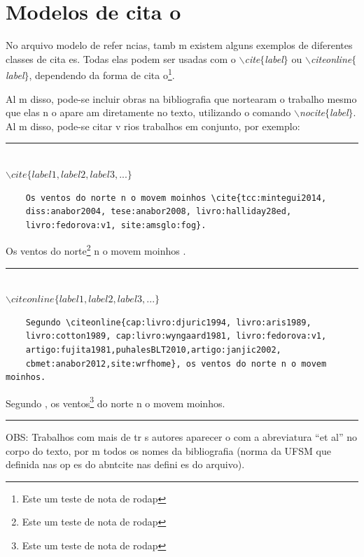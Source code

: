 \documentclass{article}
\begin{document}
   \section{Modelos de cita o}
      \par No arquivo modelo de refer ncias, tamb m existem alguns exemplos de diferentes classes de cita es. Todas elas podem ser usadas com o \textit{$\backslash$cite$\{$label$\}$} ou \textit{$\backslash$citeonline$\{$label$\}$}, dependendo da forma de cita o\footnote{Este   um teste de nota de rodap }.

	\par Al m disso, pode-se incluir obras na bibliografia que nortearam o trabalho mesmo que elas n o apare am diretamente no texto, utilizando o comando \textit{$\backslash$nocite$\{$label$\}$}. Al m disso, pode-se citar v rios trabalhos em conjunto, por exemplo:
	
	\begin{center}\rule{0.5\textwidth}{1pt}\\$\backslash cite\{label1,label2,label3,...\}$\end{center}

	\begin{verbatim}
	Os ventos do norte n o movem moinhos \cite{tcc:mintegui2014, 
	diss:anabor2004, tese:anabor2008, livro:halliday28ed, 
	livro:fedorova:v1, site:amsglo:fog}.
	\end{verbatim}
	    
	\par Os ventos do norte\footnote{Este   um teste de nota de rodap } n o movem moinhos \cite{tcc:mintegui2014,diss:anabor2004,tese:anabor2008,livro:halliday28ed,livro:fedorova:v1,site:amsglo:fog}.
        
        \begin{center}\rule{0.5\textwidth}{1pt}\\$\backslash citeonline\{label1,label2,label3,...\}$\end{center}
        
	\begin{verbatim}
	Segundo \citeonline{cap:livro:djuric1994, livro:aris1989, 
	livro:cotton1989, cap:livro:wyngaard1981, livro:fedorova:v1, 
	artigo:fujita1981,puhalesBLT2010,artigo:janjic2002,
	cbmet:anabor2012,site:wrfhome}, os ventos do norte n o movem moinhos.
	\end{verbatim}
            
        \par Segundo , os ventos\footnote{Este   um teste de nota de rodap } do norte n o movem moinhos.
        \begin{center}\rule{0.5\textwidth}{1pt}\end{center}   
         \par OBS: Trabalhos com mais de tr s autores aparecer o com a abreviatura ``et al'' no corpo do texto, por m todos os nomes da bibliografia (norma da UFSM que   definida nas op es do abntcite nas defini es do arquivo). 
  
\end{document}
